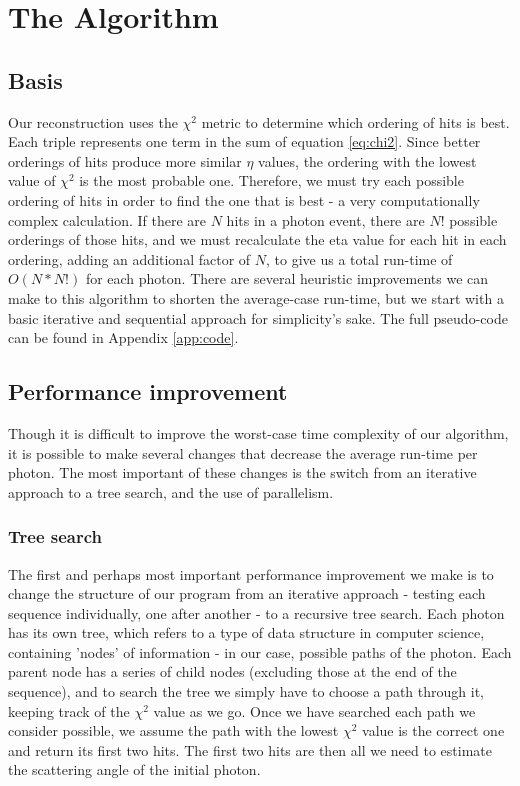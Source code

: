 \chapter{The Algorithm}

\section{Basis}

Our reconstruction uses the $\chi^2$ metric to determine which ordering of hits is best. Each triple represents one term in the sum of equation \ref{eq:chi2}. Since better orderings of hits produce more similar $\eta$ values, the ordering with the lowest value of $\chi^2$ is the most probable one. Therefore, we must try each possible ordering of hits in order to find the one that is best - a very computationally complex calculation. If there are $N$ hits in a photon event, there are $N!$ possible orderings of those hits, and we must recalculate the eta value for each hit in each ordering, adding an additional factor of $N$, to give us a total run-time of $O(N*N!)$ for each photon. There are several heuristic improvements we can make to this algorithm to shorten the average-case run-time, but we start with a basic iterative and sequential approach for simplicity's sake. The full pseudo-code can be found in Appendix \ref{app:code}.

\section{Performance improvement}
Though it is difficult to improve the worst-case time complexity of our algorithm, it is possible to make several changes that decrease the average run-time per photon. The most important of these changes is the switch from an iterative approach to a tree search, and the use of parallelism.

\subsection{Tree search}
The first and perhaps most important performance improvement we make is to change the structure of our program from an iterative approach - testing each sequence individually, one after another - to a recursive tree search. Each photon has its own tree, which refers to a type of data structure in computer science, containing 'nodes' of information - in our case, possible paths of the photon. Each parent node has a series of child nodes (excluding those at the end of the sequence), and to search the tree we simply have to choose a path through it, keeping track of the $\chi^2$ value as we go. Once we have searched each path we consider possible, we assume the path with the lowest $\chi^2$ value is the correct one and return its first two hits.  The first two hits are then all we need to estimate the scattering angle of the initial photon.


